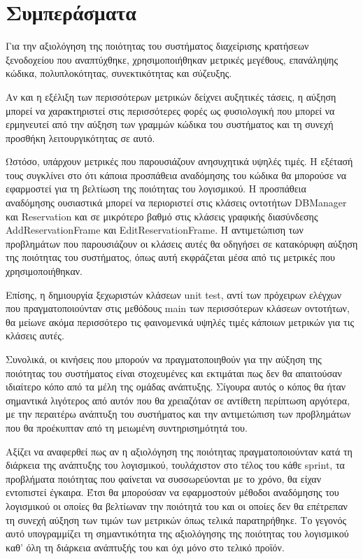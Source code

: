 \section{Συμπεράσματα}

Για την αξιολόγηση της ποιότητας του συστήματος διαχείρισης κρατήσεων
ξενοδοχείου που αναπτύχθηκε, χρησιμοποιήθηκαν μετρικές μεγέθους,
επανάληψης κώδικα, πολυπλοκότητας, συνεκτικότητας και σύζευξης.

Αν και η εξέλιξη των περισσότερων μετρικών δείχνει αυξητικές τάσεις,
η αύξηση μπορεί να χαρακτηριστεί στις περισσότερες φορές ως φυσιολογική
που μπορεί να ερμηνευτεί από την αύξηση των γραμμών κώδικα του
συστήματος και τη συνεχή προσθήκη λειτουργικότητας σε αυτό.

Ωστόσο, υπάρχουν μετρικές που παρουσιάζουν ανησυχητικά υψηλές
τιμές. Η εξέτασή τους συγκλίνει στο ότι κάποια προσπάθεια αναδόμησης του
κώδικα θα μπορούσε να εφαρμοστεί για τη βελτίωση της ποιότητας του
λογισμικού. Η προσπάθεια αναδόμησης ουσιαστικά μπορεί να περιοριστεί
στις κλάσεις οντοτήτων DBManager και Reservation και σε μικρότερο βαθμό
στις κλάσεις γραφικής διασύνδεσης AddReservationFrame και
EditReservationFrame. Η αντιμετώπιση των προβλημάτων που παρουσιάζουν οι
κλάσεις αυτές θα οδηγήσει σε κατακόρυφη αύξηση της ποιότητας του
συστήματος, όπως αυτή εκφράζεται μέσα από τις μετρικές που
χρησιμοποιήθηκαν.

Επίσης, η δημιουργία ξεχωριστών κλάσεων unit test, αντί των πρόχειρων
ελέγχων που πραγματοποιούνταν στις μεθόδους main των περισσότερων
κλάσεων οντοτήτων, θα μείωνε ακόμα περισσότερο τις φαινομενικά υψηλές
τιμές κάποιων μετρικών για τις κλάσεις αυτές.

Συνολικά, οι κινήσεις που μπορούν να πραγματοποιηθούν για την αύξηση της
ποιότητας του συστήματος είναι στοχευμένες και εκτιμάται πως δεν θα
απαιτούσαν ιδιαίτερο κόπο από τα μέλη της ομάδας ανάπτυξης. Σίγουρα
αυτός ο κόπος θα ήταν σημαντικά λιγότερος από αυτόν που θα χρειαζόταν
σε αντίθετη περίπτωση αργότερα, με την περαιτέρω ανάπτυξη του συστήματος
και την αντιμετώπιση των προβλημάτων που θα προέκυπταν από τη μειωμένη
συντηρισημότητά του.

Αξίζει να αναφερθεί πως αν η αξιολόγηση της ποιότητας πραγματοποιούνταν
κατά τη διάρκεια της ανάπτυξης του λογισμικού, τουλάχιστον στο τέλος του
κάθε sprint, τα προβλήματα ποιότητας που φαίνεται να συσσωρεύονται με το
χρόνο, θα είχαν εντοπιστεί έγκαιρα. Έτσι θα μπορούσαν να εφαρμοστούν
μέθοδοι αναδόμησης του λογισμικού οι οποίες θα βελτίωναν την ποιότητά
του και οι οποίες δεν θα επέτρεπαν τη συνεχή αύξηση των τιμών των
μετρικών όπως τελικά παρατηρήθηκε. Το γεγονός αυτό υπογραμμίζει τη
σημαντικότητα της αξιολόγησης της ποιότητας του λογισμικού καθ' όλη τη
διάρκεια ανάπτυξής του και όχι μόνο στο τελικό προϊόν.
